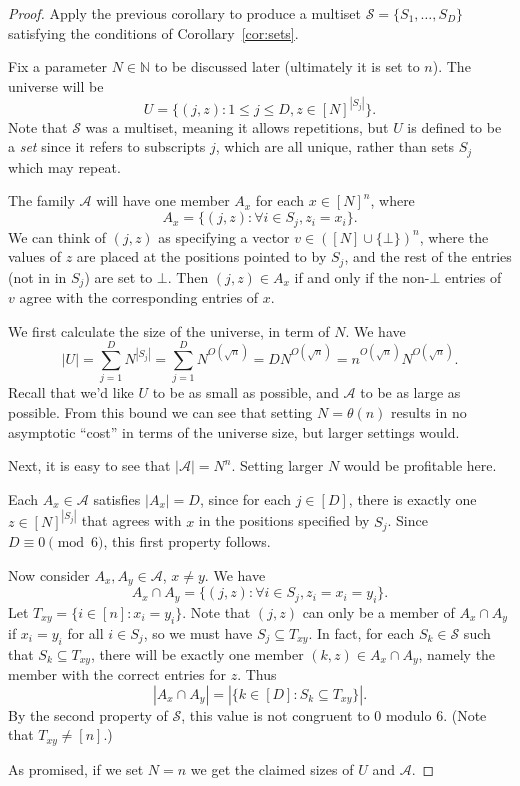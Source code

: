 \documentclass[12pt]{article}
\def\N{{\mathbb N}}
\newcommand{\calS}{\mathcal{S}}
\newcommand{\calA}{\mathcal{A}}
\begin{document}
\begin{proof}
  Apply the previous corollary to produce a multiset $\calS =
  \{S_1,\ldots,S_D\}$ satisfying the conditions of Corollary~\ref{cor:sets}.

  Fix a parameter $N\in\N$ to be discussed later (ultimately it is set to $n$).
  The universe will be
  \[
    U = \{  (j,z) : 1\leq j \leq D, z\in[N]^{|S_j|} \}.
  \]
  Note that $\calS$ was a multiset, meaning it allows repetitions, but
  $U$ is defined to be a \emph{set} since it refers to subscripts $j$, which
  are all unique, rather than sets $S_j$ which may repeat. 

  The family $\calA$ will have one member $A_x$ for each $x\in[N]^n$, where
  \[
    A_x = \{ (j,z) : \forall i\in S_j, z_i = x_i\}.
  \]
  We can think of $(j,z)$ as specifying a vector $v \in ([N]\cup\{\bot\})^n$,
  where the values of $z$ are placed at the positions pointed to by $S_j$,
  and the rest of the entries (not in in $S_j$) are set to $\bot$.
  Then $(j,z)\in A_x$ if and only if the non-$\bot$ entries of $v$ agree
  with the corresponding entries of $x$.

  We first calculate the size of the universe, in term of $N$. We have
  \[
    |U| = \sum_{j =1}^D N^{|S_j|} = 
    \sum_{j=1}^D N^{O(\sqrt{n})} =
     D N^{O(\sqrt{n})} = 
     n^{O(\sqrt{n})} N^{O(\sqrt{n})}.
  \]
  Recall that we'd like $U$ to be as small as possible, and $\calA$ to be as
  large as possible. From this bound we can see that setting $N=\theta(n)$
  results in no asymptotic ``cost'' in terms of the universe size, but
  larger settings would.

  Next, it is easy to see that $|\calA| = N^n$. Setting larger $N$ would be
  profitable here.

  Each $A_x \in \calA$ satisfies $|A_x| = D$, since for each $j \in [D]$,
  there is exactly one $z\in [N]^{|S_j|}$ that agrees with $x$ in the positions
  specified by $S_j$. Since $D \equiv 0 \pmod 6$, this first property follows.


  Now consider $A_x, A_y \in \calA$, $x \neq y$. We have
  \[
    A_x\cap A_y = \{ (j,z) : \forall i\in S_j, z_i = x_i = y_i\}.
  \]
  Let $T_{xy} = \{i \in [n] : x_i = y_i\}$. Note that $(j,z)$ can only be a member of
  $A_x \cap A_y$ if $x_i = y_i$ for all $i \in S_j$, so we must have $S_j \subseteq
  T_{xy}$.  In fact, for each $S_k\in\calS$ such that $S_k \subseteq T_{xy}$, there will be
  exactly one member $(k,z)\in A_x \cap A_y$, namely the member with the correct
  entries for $z$. Thus
  \[
    |A_x\cap A_y| = |\{ k \in [D] : S_k \subseteq T_{xy} \}|.
  \]
  By the second property of $\calS$, this value is not congruent to $0$ modulo
  $6$. (Note that $T_{xy} \neq [n]$.)

  As promised, if we set $N=n$ we get the claimed sizes of $U$ and $\calA$.
\end{proof}
\end{document}

